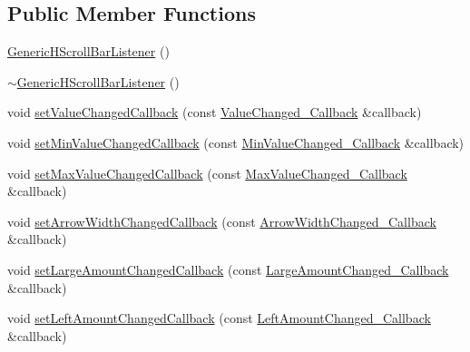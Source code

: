 \subsection*{Public Member Functions}
\begin{DoxyCompactItemize}
\item 
\mbox{\hyperlink{classec_1_1_generic_h_scroll_bar_listener_a4b95d78b240d90fe4ad216460980cfb1}{Generic\+H\+Scroll\+Bar\+Listener}} ()
\item 
\mbox{\hyperlink{classec_1_1_generic_h_scroll_bar_listener_a2df3783555cb73b5f25d4c42f64dae99}{$\sim$\+Generic\+H\+Scroll\+Bar\+Listener}} ()
\item 
void \mbox{\hyperlink{classec_1_1_generic_h_scroll_bar_listener_a6b33c23b467c4a006acca5e134fc9f12}{set\+Value\+Changed\+Callback}} (const \mbox{\hyperlink{classec_1_1_generic_h_scroll_bar_listener_ad02a375c4835a99a41bcd97b6a408637}{Value\+Changed\+\_\+\+Callback}} \&callback)
\item 
void \mbox{\hyperlink{classec_1_1_generic_h_scroll_bar_listener_ae2dde713f09d2f9953ef1aa0f2103804}{set\+Min\+Value\+Changed\+Callback}} (const \mbox{\hyperlink{classec_1_1_generic_h_scroll_bar_listener_a0e75a452c9f937fb1539bdb395fb62a5}{Min\+Value\+Changed\+\_\+\+Callback}} \&callback)
\item 
void \mbox{\hyperlink{classec_1_1_generic_h_scroll_bar_listener_aee47b44914dfb3c8a7f00dec14392030}{set\+Max\+Value\+Changed\+Callback}} (const \mbox{\hyperlink{classec_1_1_generic_h_scroll_bar_listener_a477535313b5feb1040874b1c0c9c9d1f}{Max\+Value\+Changed\+\_\+\+Callback}} \&callback)
\item 
void \mbox{\hyperlink{classec_1_1_generic_h_scroll_bar_listener_ab74b91e3fe9cfa656a0ba09a9391173e}{set\+Arrow\+Width\+Changed\+Callback}} (const \mbox{\hyperlink{classec_1_1_generic_h_scroll_bar_listener_a5f6e07b1012f51b6ef9be3d9ac81e121}{Arrow\+Width\+Changed\+\_\+\+Callback}} \&callback)
\item 
void \mbox{\hyperlink{classec_1_1_generic_h_scroll_bar_listener_ad364e01abb00b07d0bca10e788e8340f}{set\+Large\+Amount\+Changed\+Callback}} (const \mbox{\hyperlink{classec_1_1_generic_h_scroll_bar_listener_a668ece57152ae7212f4e7b68a202da04}{Large\+Amount\+Changed\+\_\+\+Callback}} \&callback)
\item 
void \mbox{\hyperlink{classec_1_1_generic_h_scroll_bar_listener_a78e3ff058a6158558caef17db6fac3e5}{set\+Left\+Amount\+Changed\+Callback}} (const \mbox{\hyperlink{classec_1_1_generic_h_scroll_bar_listener_ab6d93e64747e807550ab74972a06a608}{Left\+Amount\+Changed\+\_\+\+Callback}} \&callback)

\end{DoxyCompactItemize}
